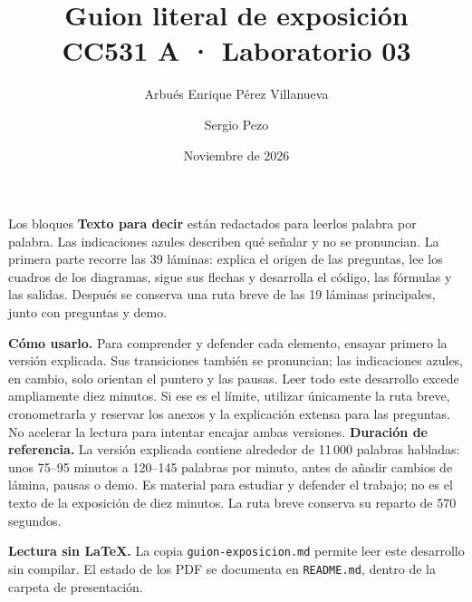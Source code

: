 \documentclass[10pt,a4paper]{article}
\title{\vspace{-1cm}Guion literal de exposición\\\large CC531 A · Laboratorio 03}
\author{Arbués Enrique Pérez Villanueva \and Sergio Pezo}
\date{Noviembre de 2026}
\begin{document}
\maketitle
\noindent Los bloques \textbf{Texto para decir} están redactados para leerlos palabra por palabra.
Las indicaciones azules describen qué señalar y no se pronuncian.
La primera parte recorre las 39 láminas: explica el origen de las preguntas,
lee los cuadros de los diagramas, sigue sus flechas y desarrolla el código, las fórmulas y las salidas.
Después se conserva una ruta breve de las 19 láminas principales, junto con preguntas y demo.

\medskip\noindent\textbf{Cómo usarlo.} Para comprender y defender cada elemento, ensayar
primero la versión explicada. Sus transiciones también se pronuncian; las indicaciones azules,
en cambio, solo orientan el puntero y las pausas. Leer todo este desarrollo excede ampliamente
diez minutos. Si ese es el límite, utilizar únicamente la ruta breve, cronometrarla y reservar
los anexos y la explicación extensa para las preguntas. No acelerar la lectura para intentar
encajar ambas versiones.
\medskip\noindent\textbf{Duración de referencia.} La versión explicada contiene alrededor de
11\,000 palabras habladas: unos 75--95 minutos a 120--145 palabras por minuto,
antes de añadir cambios de lámina, pausas o demo. Es material para estudiar y defender el trabajo;
no es el texto de la exposición de diez minutos. La ruta breve conserva su reparto de 570 segundos.

\medskip\noindent\textbf{Lectura sin LaTeX.} La copia \texttt{guion-exposicion.md}
permite leer este desarrollo sin compilar. El estado de los PDF se documenta
en \texttt{README.md}, dentro de la carpeta de presentación.
\end{document}

